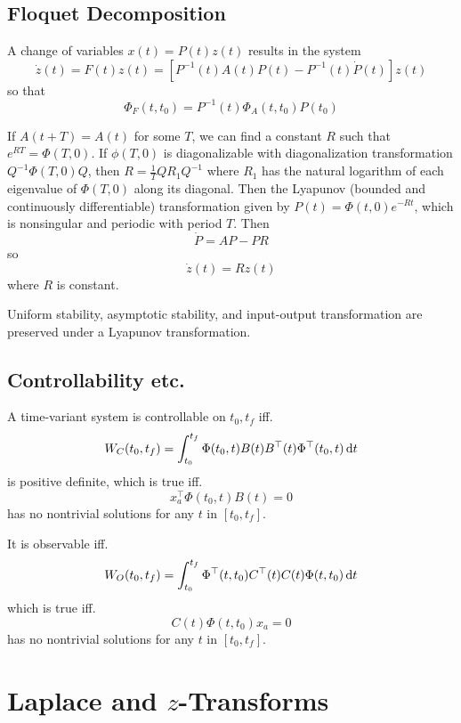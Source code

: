 \documentclass{report}
\begin{document}
\subsection{Floquet Decomposition}
A change of variables $x(t) = P(t) z(t)$ results in the system
$$
  \dot{z}(t)
= F(t) z(t)
= [P^{-1}(t) A(t) P(t) - P^{-1}(t) \dot{P}(t)]z(t)
$$
so that
$$
\Phi_F(t, t_0) = P^{-1}(t) \Phi_A(t, t_0) P(t_0)
$$

If $A(t + T) = A(t)$ for some $T$, we can find a constant $R$ such
that $e^{RT} = \Phi(T, 0)$. If $\phi(T, 0)$ is diagonalizable with
diagonalization transformation $Q^{-1} \Phi(T, 0) Q$, then
$R = \frac{1}{T} Q R_1 Q^{-1}$ where $R_1$ has the natural logarithm
of each eigenvalue of $\Phi(T, 0)$ along its diagonal. Then the
Lyapunov (bounded and continuously differentiable) transformation
given by $P(t) = \Phi(t,0)e^{-Rt}$, which is nonsingular and periodic
with period $T$. Then
$$
\dot{P} = A P - P R
$$
so
$$
\dot{z}(t) = R z(t)
$$
where $R$ is constant.

Uniform stability, asymptotic stability, and input-output
transformation are preserved under a Lyapunov transformation.

\subsection{Controllability etc.}
A time-variant system is controllable on $t_0, t_f$ iff.
$$
W_C(t_0, t_f) =
\int_{t_0}^{t_f} \Phi(t_0, t) B(t) B^\top(t) \Phi^\top(t_0, t) \dif t
$$
is positive definite, which is true iff.
$$
x_a^\top \Phi(t_0, t) B(t) = 0
$$
has no nontrivial solutions for any $t$ in $[t_0, t_f]$.

It is observable iff.
$$
W_O(t_0, t_f) =
\int_{t_0}^{t_f} \Phi^\top(t, t_0) C^\top(t) C(t) \Phi(t, t_0) \dif t
$$
which is true iff.
$$
C(t) \Phi(t, t_0) x_a = 0
$$
has no nontrivial solutions for any $t$ in $[t_0, t_f]$.

\section{Laplace and $z$-Transforms}
\end{document}
